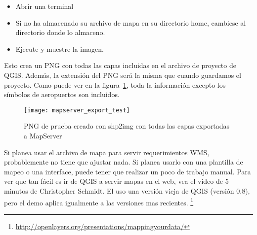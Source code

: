 \begin{itemize}
\item Abrir una terminal
\item Si no ha almacenado su archivo de mapa en su directorio home, cambiese al
  directorio donde lo almaceno.
\item Ejecute  y 
  muestre la imagen. 
\end{itemize}
 
Esto crea un PNG con todas las capas incluidas en el archivo de proyecto de QGIS. 
Además, la extensión del PNG será la misma que cuando guardamos el proyecto.
Como puede ver en la figura~\ref{fig:mapserver_export_test}, toda la  
información excepto los símbolos de aeropuertos son incluidos.

\begin{figure}[ht]
\begin{center}
  \caption{PNG de prueba creado con shp2img con todas las capas exportadas a MapServer \nixcaption}
  \label{fig:mapserver_export_test}\smallskip
  \texttt{[image: mapserver\_export\_test]}
\end{center}
\end{figure}

Si planea usar el archivo de mapa para servir requerimientos WMS, probablemente no
tiene que ajustar nada. Si planea usarlo con una plantilla de mapeo o una
interface, puede tener que realizar un poco de trabajo manual. Para ver que tan fácil
es ir de QGIS a servir mapas en el web, vea el video de
5 minutos de Christopher Schmidt. El uso una versión vieja de QGIS (versión 0.8), pero el demo aplica
igualmente a las versiones mas recientes.
\footnote{\url{http://openlayers.org/presentations/mappingyourdata/}}
